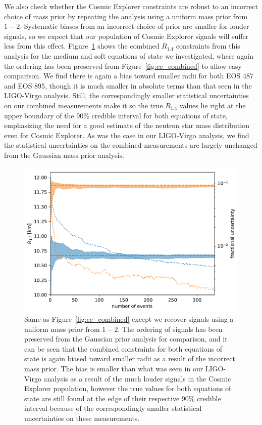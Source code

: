 We also check whether the Cosmic Explorer constraints are robust to an incorrect choice of mass prior by repeating the analysis using a uniform mass prior from $1-2$\msun. Systematic biases from an incorrect choice of prior are smaller for louder signals, so we expect that our population of Cosmic Explorer signals will suffer less from this effect. Figure~\ref{fig:ce_combined_uniform} shows the combined $R_{1.4}$ constraints from this analysis for the medium and soft equations of state we investigated, where again the ordering has been preserved from Figure~\ref{fig:ce_combined} to allow easy comparison. We find there is again a bias toward smaller radii for both EOS 487 and EOS 895, though it is much smaller in absolute terms than that seen in the LIGO-Virgo analysis. Still, the correspondingly smaller statistical uncertainties on our combined measurements make it so the true $R_{1.4}$ values lie right at the upper boundary of the 90\% credible interval for both equations of state, emphasizing the need for a good estimate of the neutron star mass distribution even for Cosmic Explorer. As was the case in our LIGO-Virgo analysis, we find the statistical uncertainties on the combined measurements are largely unchanged from the Gaussian mass prior analysis.

\begin{figure}[ht]
\includegraphics[width=\textwidth]{Figures/eos-meas/final_pop_ce_combined_radius_3eos_uniform_prior_seed1_bw0p3.pdf}
\caption{Same as Figure~\ref{fig:ce_combined} except we recover signals using a uniform mass prior from $1-2$\msun. The ordering of signals has been preserved from the Gaussian prior analysis for comparison, and it can be seen that the combined constraints for both equations of state is again biased toward smaller radii as a result of the incorrect mass prior. The bias is smaller than what was seen in our LIGO-Virgo analysis as a result of the much louder signals in the Cosmic Explorer population, however the true values for both equations of state are still found at the edge of their respective 90\% credible interval because of the correspondingly smaller statistical uncertainties on these measurements.}
\label{fig:ce_combined_uniform}
\end{figure}


